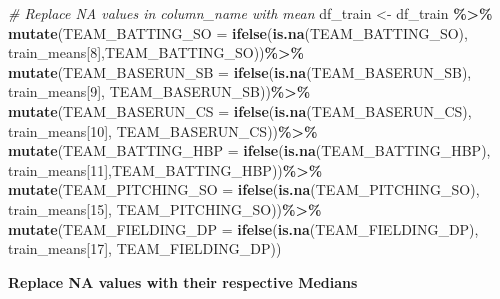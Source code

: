 \documentclass[
]{article}
\newenvironment{Shaded}{\begin{snugshade}}{\end{snugshade}}
\newcommand{\AttributeTok}[1]{\textcolor[rgb]{0.13,0.29,0.53}{#1}}
\newcommand{\CommentTok}[1]{\textcolor[rgb]{0.56,0.35,0.01}{\textit{#1}}}
\newcommand{\DecValTok}[1]{\textcolor[rgb]{0.00,0.00,0.81}{#1}}
\newcommand{\FunctionTok}[1]{\textcolor[rgb]{0.13,0.29,0.53}{\textbf{#1}}}
\newcommand{\NormalTok}[1]{#1}
\newcommand{\OtherTok}[1]{\textcolor[rgb]{0.56,0.35,0.01}{#1}}
\newcommand{\SpecialCharTok}[1]{\textcolor[rgb]{0.81,0.36,0.00}{\textbf{#1}}}
\begin{document}
\begin{Shaded}
\begin{Highlighting}[]
\CommentTok{\# Replace NA values in \textquotesingle{}column\_name\textquotesingle{} with \textquotesingle{}mean\textquotesingle{}}
\NormalTok{df\_train }\OtherTok{\textless{}{-}}\NormalTok{ df\_train }\SpecialCharTok{\%\textgreater{}\%}
  \FunctionTok{mutate}\NormalTok{(}\AttributeTok{TEAM\_BATTING\_SO =}
           \FunctionTok{ifelse}\NormalTok{(}\FunctionTok{is.na}\NormalTok{(TEAM\_BATTING\_SO),}
\NormalTok{                  train\_means[}\DecValTok{8}\NormalTok{],TEAM\_BATTING\_SO))}\SpecialCharTok{\%\textgreater{}\%} 
  \FunctionTok{mutate}\NormalTok{(}\AttributeTok{TEAM\_BASERUN\_SB =} 
           \FunctionTok{ifelse}\NormalTok{(}\FunctionTok{is.na}\NormalTok{(TEAM\_BASERUN\_SB),}
\NormalTok{                  train\_means[}\DecValTok{9}\NormalTok{], TEAM\_BASERUN\_SB))}\SpecialCharTok{\%\textgreater{}\%}
  \FunctionTok{mutate}\NormalTok{(}\AttributeTok{TEAM\_BASERUN\_CS =}
           \FunctionTok{ifelse}\NormalTok{(}\FunctionTok{is.na}\NormalTok{(TEAM\_BASERUN\_CS),}
\NormalTok{                  train\_means[}\DecValTok{10}\NormalTok{], TEAM\_BASERUN\_CS))}\SpecialCharTok{\%\textgreater{}\%}
  \FunctionTok{mutate}\NormalTok{(}\AttributeTok{TEAM\_BATTING\_HBP =} 
           \FunctionTok{ifelse}\NormalTok{(}\FunctionTok{is.na}\NormalTok{(TEAM\_BATTING\_HBP),}
\NormalTok{                  train\_means[}\DecValTok{11}\NormalTok{],TEAM\_BATTING\_HBP))}\SpecialCharTok{\%\textgreater{}\%}
  \FunctionTok{mutate}\NormalTok{(}\AttributeTok{TEAM\_PITCHING\_SO =}
           \FunctionTok{ifelse}\NormalTok{(}\FunctionTok{is.na}\NormalTok{(TEAM\_PITCHING\_SO),}
\NormalTok{                  train\_means[}\DecValTok{15}\NormalTok{], TEAM\_PITCHING\_SO))}\SpecialCharTok{\%\textgreater{}\%}
  \FunctionTok{mutate}\NormalTok{(}\AttributeTok{TEAM\_FIELDING\_DP =}
           \FunctionTok{ifelse}\NormalTok{(}\FunctionTok{is.na}\NormalTok{(TEAM\_FIELDING\_DP),}
\NormalTok{                  train\_means[}\DecValTok{17}\NormalTok{], TEAM\_FIELDING\_DP))}
\end{Highlighting}
\end{Shaded}

\textbf{Replace NA values with their respective Medians}
\end{document}
